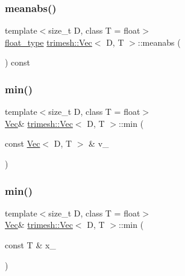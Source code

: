\mbox{\label{classtrimesh_1_1Vec_ac459dca66d94b8db6dafa46dbc0f680a}} 
\subsubsection{\texorpdfstring{meanabs()}{meanabs()}}
{\footnotesize\ttfamily template$<$size\+\_\+t D, class T = float$>$ \\
\hyperlink{classtrimesh_1_1Vec_a2593716457a143008832235a3e4a9155}{float\+\_\+type} \hyperlink{classtrimesh_1_1Vec}{trimesh\+::\+Vec}$<$ D, T $>$\+::meanabs (\begin{DoxyParamCaption}{ }\end{DoxyParamCaption}) const\hspace{0.3cm}{\ttfamily [inline]}}

\mbox{\label{classtrimesh_1_1Vec_a8b8ab7f38bfcf8c82fbca33d49ca6bd6}} 
\subsubsection{\texorpdfstring{min()}{min()}\hspace{0.1cm}{\footnotesize\ttfamily [1/3]}}
{\footnotesize\ttfamily template$<$size\+\_\+t D, class T = float$>$ \\
\hyperlink{classtrimesh_1_1Vec}{Vec}\& \hyperlink{classtrimesh_1_1Vec}{trimesh\+::\+Vec}$<$ D, T $>$\+::min (\begin{DoxyParamCaption}\item[{const \hyperlink{classtrimesh_1_1Vec}{Vec}$<$ D, T $>$ \&}]{v\+\_\+ }\end{DoxyParamCaption})\hspace{0.3cm}{\ttfamily [inline]}}

\mbox{\label{classtrimesh_1_1Vec_a7dcd7ab1a385c55e489f4798ad98bc01}} 
\subsubsection{\texorpdfstring{min()}{min()}\hspace{0.1cm}{\footnotesize\ttfamily [2/3]}}
{\footnotesize\ttfamily template$<$size\+\_\+t D, class T = float$>$ \\
\hyperlink{classtrimesh_1_1Vec}{Vec}\& \hyperlink{classtrimesh_1_1Vec}{trimesh\+::\+Vec}$<$ D, T $>$\+::min (\begin{DoxyParamCaption}\item[{const T \&}]{x\+\_\+ }\end{DoxyParamCaption})\hspace{0.3cm}{\ttfamily [inline]}}


